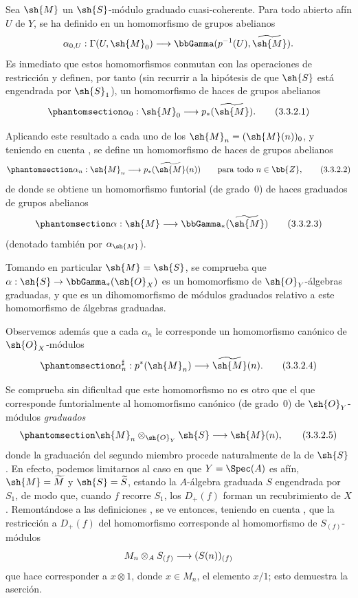 \documentclass[oneside,10pt]{amsart}
\makeatletter
\newcommand{\ega@arrow}[2]{\mathchoice{#1}{#2}{#2}{#2}}
\renewcommand{\to}{\ega@arrow{\longrightarrow}{\rightarrow}}
\newcommand{\oldpage}[2][]{\marginnote{\normalfont\footnotesize\textbf{#1}~|~#2}\ignorespaces}
\let\EGAOriginalLabel\label
\renewcommand{\label}[1]{\phantomsection\EGAOriginalLabel{#1}}
\makeatother
\begin{document}
\begin{env}[3.3.2]
\label{II.3.3.2}
Sea $\sh{M}$ un $\sh{S}$-módulo graduado cuasi-coherente.
Para todo abierto afín $U$ de $Y$, se ha definido en  un homomorfismo de grupos abelianos
\[
  \alpha_{0,U}:\Gamma(U,\sh{M}_0)
  \to\bbGamma(p^{-1}(U),\widetilde{\sh{M}}).
\]
Es inmediato que estos homomorfismos conmutan con las operaciones de restricción  y definen, por tanto (sin recurrir a la hipótesis de que $\sh{S}$ está engendrada por $\sh{S}_1$), un homomorfismo de haces de grupos abelianos
\[
\label{II.3.3.2.1}
  \alpha_0:\sh{M}_0\to p_*(\widetilde{\sh{M}}).
\tag{3.3.2.1}
\]

Aplicando este resultado a cada uno de los $\sh{M}_n=(\sh{M}(n))_0$, y teniendo en cuenta , se define un homomorfismo de haces de grupos abelianos
\[
\label{II.3.3.2.2}
  \alpha_n:\sh{M}_n\to p_*(\widetilde{\sh{M}}(n))
  \qquad\text{para todo }n\in\bb{Z},
\tag{3.3.2.2}
\]
de donde se obtiene un homomorfismo funtorial (de grado~$0$) de haces graduados de grupos abelianos
\[
\label{II.3.3.2.3}
  \alpha:\sh{M}\to\bbGamma_*(\widetilde{\sh{M}})
\tag{3.3.2.3}
\]
(denotado también por $\alpha_{\sh{M}}$).

Tomando en particular $\sh{M}=\sh{S}$, se comprueba que $\alpha:\sh{S}\to\bbGamma_*(\sh{O}_X)$ es un homomorfismo de $\sh{O}_Y$-álgebras graduadas, y que  es un dihomomorfismo de módulos graduados relativo a este homomorfismo de álgebras graduadas.

Observemos además que a cada $\alpha_n$ le corresponde  un homomorfismo canónico de $\sh{O}_X$-módulos
\[
\label{II.3.3.2.4}
  \alpha_n^\sharp:p^*(\sh{M}_n)\to\widetilde{\sh{M}}(n).
\tag{3.3.2.4}
\]

Se comprueba sin dificultad que este homomorfismo no es otro que el que corresponde funtorialmente  al homomorfismo canónico (de grado~$0$) de $\sh{O}_Y$-módulos \emph{graduados}
\[
\label{II.3.3.2.5}
  \sh{M}_n\otimes_{\sh{O}_Y}\sh{S}\to\sh{M}(n),
\tag{3.3.2.5}
\]
\oldpage[II]{58}
donde la graduación del segundo miembro procede naturalmente de la de $\sh{S}$.
En efecto, podemos limitarnos al caso en que $Y=\Spec(A)$ es afín, $\sh{M}=\widetilde{M}$ y $\sh{S}=\widetilde{S}$, estando la $A$-álgebra graduada $S$ engendrada por $S_1$, de modo que, cuando $f$ recorre $S_1$, los $D_+(f)$ forman un recubrimiento de $X$.
Remontándose a las definiciones , se ve entonces, teniendo en cuenta , que la restricción a $D_+(f)$ del homomorfismo  corresponde  al homomorfismo de $S_{(f)}$-módulos
\[
  M_n\otimes_A S_{(f)}\to(S(n))_{(f)}
\]
que hace corresponder a $x\otimes1$, donde $x\in M_n$, el elemento $x/1$; esto demuestra la aserción.
\end{env}
\end{document}
